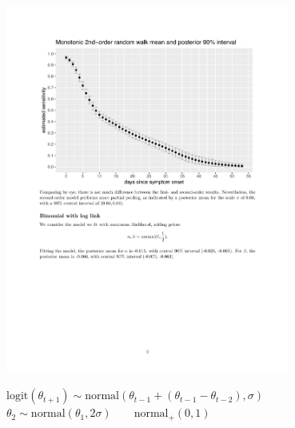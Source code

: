 \documentclass[9pt]{report}
\begin{document}
\includegraphics[width=0.7\textwidth]{img/mono-bayes-rw2.pdf}
\vspace*{-3pt}
\begin{subitemize}
\item $\textrm{logit}(\theta_{t+1}) \sim
  \textrm{normal}(\theta_{t-1} + (\theta_{t-1} - \theta_{t-2}),
  \sigma)$
  \\
  $\theta_2 \sim \textrm{normal}(\theta_1, 2\sigma)
  \qquad
  \textrm{normal}_+(0, 1)$
\end{subitemize}


  
\end{document}

